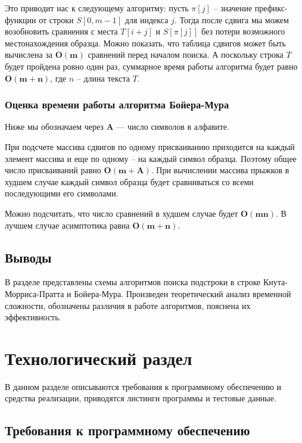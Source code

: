 \documentclass[a4paper,12pt]{article}
\begin{document}
Это приводит нас к следующему алгоритму: пусть
$\pi[j]$ -- значение префикс-функции от 
строки $S[0, m - 1]$ для индекса $j$. 
Тогда после сдвига мы можем возобновить сравнения с 
места $T[i + j]$ и $S[\pi[j]]$ без потери возможного 
местонахождения образца. Можно показать, 
что таблица 
сдвигов может быть вычислена
за $\mathbf{O(m)}$ сравнений перед 
началом поиска. А поскольку строка $T$ будет 
пройдена 
ровно один раз, суммарное время работы алгоритма 
будет равно $\mathbf{O(m + n)}$, где $n$ -- длина 
текста $T$. ~\cite{knuth}

\subsubsection{Оценка времени работы алгоритма Бойера-Мура}

Ниже мы обозначаем через $\mathbf{A}$ — число символов в алфавите.

При подсчете массива сдвигов по одному присваиванию приходится
на каждый элемент массива и еще по одному -- на каждый символ
образца. Поэтому общее число присваиваний равно $\mathbf{O(m + A)}$.
При вычислении массива прыжков в худшем случае каждый символ
образца будет сравниваться со всеми последующими его символами.

Можно подсчитать, что число сравнений в худшем случае
будет $\mathbf{O(mn)}$. В лучшем случае асимптотика равна $\mathbf{O(m + n)}$.
~\cite{eng_bm}


\subsection*{Выводы}

В разделе представлены схемы алгоритмов поиска подстроки в строке
Кнута-Морриса-Пратта и Бойера-Мура.
Произведен теоретический анализ
временной сложности, обозначены различия в работе алгоритмов,
пояснена их эффективность.
\newpage
\section{Технологический раздел}

В данном разделе описываются требования к программному 
обеспечению и средства реализации, приводятся листинги 
программы и тестовые данные.

\subsection{Требования к программному обеспечению}
\end{document}
